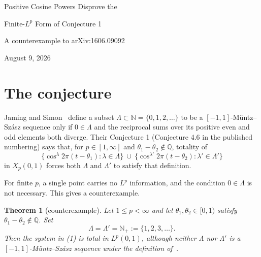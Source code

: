\documentclass[10pt]{article}
\newtheorem{theorem}{Theorem}
\newcommand{\Npos}{\mathbb N_{+}}
\begin{document}
\begin{center}
{\LARGE Positive Cosine Powers Disprove the}\par\vspace{0.15em}
{\LARGE Finite-$L^p$ Form of Conjecture 1}\par\vspace{0.4em}
{\large A counterexample to arXiv:1606.09092}\par\vspace{0.2em}
August 9, 2026
\end{center}

\begin{center}
\end{center}

\section*{The conjecture}

Jaming and Simon~\cite{JamingSimon} define a subset
$\Lambda\subset\mathbb N=\{0,1,2,\ldots\}$ to be a
$[-1,1]$-M\"untz--Sz\'asz sequence only if $0\in\Lambda$ and the reciprocal
sums over its positive even and odd elements both diverge. Their Conjecture 1
(Conjecture 4.6 in the published numbering) says that, for
$p\in[1,\infty]$ and $\theta_1-\theta_2\notin\mathbb Q$, totality of
\[
 \{\cos^\lambda 2\pi(t-\theta_1):\lambda\in\Lambda\}
 \ \cup\
 \{\cos^{\lambda'}2\pi(t-\theta_2):\lambda'\in\Lambda'\}
 \tag{1}
\]
in $X_p(0,1)$ forces both $\Lambda$ and $\Lambda'$ to satisfy that definition.

For finite $p$, a single point carries no $L^p$ information, and the condition
$0\in\Lambda$ is not necessary. This gives a counterexample.

\begin{theorem}[counterexample]\label{thm:counterexample}
Let $1\le p<\infty$ and let $\theta_1,\theta_2\in[0,1)$ satisfy
$\theta_1-\theta_2\notin\mathbb Q$. Set
\[
                  \Lambda=\Lambda'=\Npos:=\{1,2,3,\ldots\}.
\]
Then the system in \emph{(1)} is total in $L^p(0,1)$, although neither
$\Lambda$ nor $\Lambda'$ is a $[-1,1]$-M\"untz--Sz\'asz sequence under the
definition of~\cite{JamingSimon}.
\end{theorem}
\end{document}
